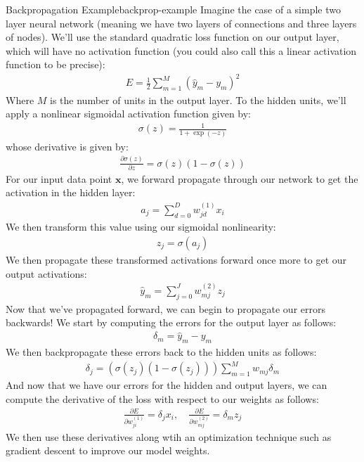 \begin{example}{Backpropagation Example}{backprop-example}
	Imagine the case of a simple two layer neural network (meaning we have two layers of connections and three layers of nodes). We'll use the standard quadratic loss function on our output layer, which will have no activation function (you could also call this a linear activation function to be precise):
	\begin{align*}
		E = \frac{1}{2} \sum_{m=1}^{M} (\hat{y}_{m} - y_{m})^{2}
	\end{align*}
	Where $M$ is the number of units in the output layer. To the hidden units, we'll apply a nonlinear sigmoidal activation function given by:
	\begin{align*}
		\sigma(z) = \frac{1}{1 + \exp{(-z)}}
	\end{align*}
	whose derivative is given by:
	\begin{align*}
		\frac{\partial \sigma(z)}{\partial z} = \sigma(z)(1 - \sigma(z))
	\end{align*}
	For our input data point $\textbf{x}$, we forward propagate through our network to get the activation in the hidden layer:
	\begin{align*}
		a_{j} = \sum_{d=0}^{D} w_{jd}^{(1)} x_{i}
	\end{align*}
	We then transform this value using our sigmoidal nonlinearity:
	\begin{align*}
		z_{j} = \sigma{(a_{j})}
	\end{align*}
	We then propagate these transformed activations forward once more to get our output activations:
	\begin{align*}
		\hat{y}_{m} = \sum_{j=0}^{J} w_{mj}^{(2)} z_{j}
	\end{align*}
	Now that we've propagated forward, we can begin to propagate our errors backwards! We start by computing the errors for the output layer as follows:
	\begin{align*}
		\delta_{m} = \hat{y}_{m} - y_{m}
	\end{align*}
	We then backpropagate these errors back to the hidden units as follows:
	\begin{align*}
		\delta_{j} = (\sigma(z_{j})(1 - \sigma(z_{j}))) \sum_{m=1}^{M} w_{mj} \delta_{m}
	\end{align*}
	And now that we have our errors for the hidden and output layers, we can compute the derivative of the loss with respect to our weights as follows:
	\begin{align*}
		\frac{\partial E}{\partial w_{ji}^{(1)}} = \delta_{j} x_{i}, \quad \frac{\partial E}{\partial w_{mj}^{(2)}} = \delta_{m} z_{j}
	\end{align*}
	We then use these derivatives along wtih an optimization technique such as gradient descent to improve our model weights.
\end{example}

